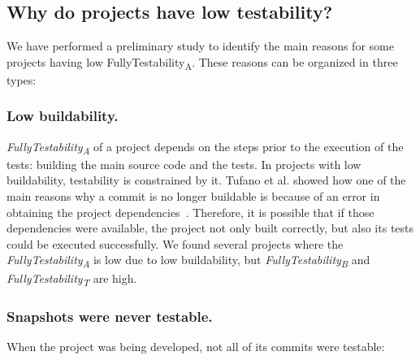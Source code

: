 
\subsection{Why do projects have low testability?}
\label{sec:low-testability}

We have performed a preliminary study to identify the main reasons for some projects having low FullyTestability\textsubscript{A}. 
These reasons can be organized in three types:

\subsubsection{Low buildability.} 

\textit{FullyTestability\textsubscript{A}} of a project depends on the steps prior to the execution of the tests: building the main source code and the tests.
In projects with low buildability, testability is constrained by it.
Tufano et al. showed how one of the main reasons why a commit is no longer buildable is because of an error in obtaining the project dependencies~\cite{tufano2017there}. 
Therefore, it is possible that if those dependencies were available, the project not only built correctly, but also its tests could be executed successfully. 
We found several projects where the \textit{FullyTestability\textsubscript{A}} is low due to low buildability, but \textit{FullyTestability\textsubscript{B}} and \textit{FullyTestability\textsubscript{T}} are high.

\subsubsection{Snapshots were never testable.} When the project was being developed, not all of its commits were testable:

